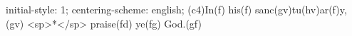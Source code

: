 initial-style: 1;
centering-scheme: english;
(c4)In(f) his(f) sanc(gv)tu(hv)ar(f)y,(gv) <sp>*</sp> praise(fd) ye(fg) God.(gf)
